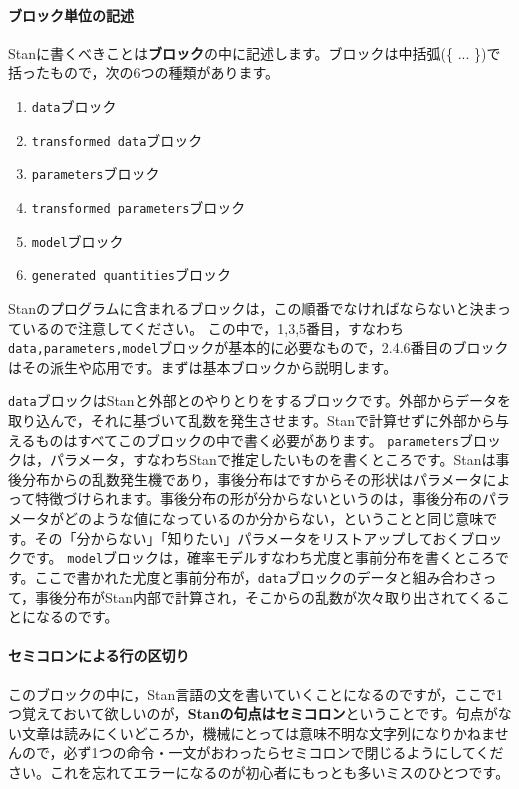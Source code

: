 \documentclass{ltjsbook}
\begin{document}
\paragraph{ブロック単位の記述}
Stanに書くべきことは\textbf{ブロック}の中に記述します。ブロックは中括弧(\{ ... \})で括ったもので，次の6つの種類があります。
\begin{enumerate}
	\item \texttt{data}ブロック
	\item \texttt{transformed data}ブロック
	\item \texttt{parameters}ブロック
	\item \texttt{transformed parameters}ブロック
	\item \texttt{model}ブロック
	\item \texttt{generated quantities}ブロック
\end{enumerate}

Stanのプログラムに含まれるブロックは，この順番でなければならないと決まっているので注意してください。
この中で，1,3,5番目，すなわち\texttt{data,parameters,model}ブロックが基本的に必要なもので，2.4.6番目のブロックはその派生や応用です。まずは基本ブロックから説明します。

\texttt{data}ブロックはStanと外部とのやりとりをするブロックです。外部からデータを取り込んで，それに基づいて乱数を発生させます。Stanで計算せずに外部から与えるものはすべてこのブロックの中で書く必要があります。
\texttt{parameters}ブロックは，パラメータ，すなわちStanで推定したいものを書くところです。Stanは事後分布からの乱数発生機であり，事後分布はですからその形状はパラメータによって特徴づけられます。事後分布の形が分からないというのは，事後分布のパラメータがどのような値になっているのか分からない，ということと同じ意味です。その「分からない」「知りたい」パラメータをリストアップしておくブロックです。
\texttt{model}ブロックは，確率モデルすなわち尤度と事前分布を書くところです。ここで書かれた尤度と事前分布が，\texttt{data}ブロックのデータと組み合わさって，事後分布がStan内部で計算され，そこからの乱数が次々取り出されてくることになるのです。

\paragraph{セミコロンによる行の区切り}
このブロックの中に，Stan言語の文を書いていくことになるのですが，ここで1つ覚えておいて欲しいのが，\textbf{Stanの句点はセミコロン}ということです。句点がない文章は読みにくいどころか，機械にとっては意味不明な文字列になりかねませんので，必ず1つの命令・一文がおわったらセミコロンで閉じるようにしてください。これを忘れてエラーになるのが初心者にもっとも多いミスのひとつです。
\end{document}
